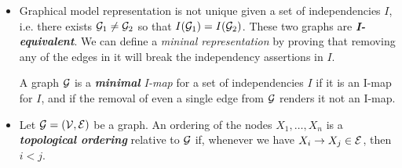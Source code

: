 \documentclass[11pt]{article}
\begin{document}
\begin{itemize}
\item Graphical model representation is not unique given a set of independencies $I$, i.e. there exists ${\mathcal G}_1 \neq {\mathcal G}_2$ so that $I({\mathcal G}_1) = I({\mathcal G}_2)$. These two graphs are \textbf{\emph{I-equivalent}}. We can define a \emph{mininal representation} by proving that removing any of the edges in it will break the independency assertions in $I$.
\begin{definition}
A graph ${\mathcal G}$ is a \emph{\textbf{minimal} I-map} for a set of independencies $I$ if it is an I-map for $I$, and if the removal of even a single edge from ${\mathcal G}$ renders it not an I-map.
\end{definition}

\item 
\begin{definition}
Let ${\mathcal G} = ({\mathcal V},  {\mathcal E})$ be a graph. An ordering of the nodes $X_1, \ldots, X_n$ is a \emph{\textbf{topological ordering}} relative to ${\mathcal G}$ if, whenever we have $X_i \rightarrow X_j \in {\mathcal E}$, then $i < j$.
\end{definition}
\end{itemize}
\end{document}
